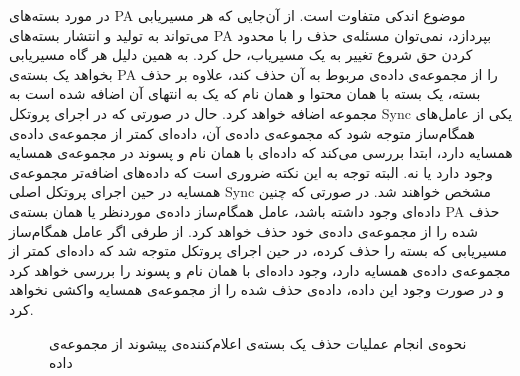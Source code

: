 در مورد بسته‌های PA موضوع اندکی متفاوت است. از آن‌جایی که هر مسیریابی می‌تواند به تولید و انتشار بسته‌های PA بپردازد، نمی‌توان مسئله‌ی حذف را با محدود کردن حق شروع تغییر به یک مسیریاب، حل کرد. به همین دلیل هر گاه مسیریابی بخواهد یک بسته‌ی PA را از مجموعه‌ی داده‌ی مربوط به آن حذف کند، علاوه بر حذف بسته، یک بسته با همان محتوا و همان نام که یک  به انتهای آن اضافه شده است به مجموعه اضافه خواهد کرد. حال در صورتی که در اجرای پروتکل Sync یکی از عامل‌های همگام‌ساز متوجه شود که مجموعه‌ی داده‌ی آن، داده‌ای کمتر از مجموعه‌ی داده‌ی همسایه دارد، ابتدا بررسی می‌کند که داده‌ای با همان نام و پسوند  در مجموعه‌ی همسایه وجود دارد یا نه. البته توجه به این نکته ضروری است که داده‌های اضافه‌تر مجموعه‌ی همسایه در حین اجرای پروتکل اصلی Sync مشخص خواهند شد. در صورتی که چنین داده‌ای وجود داشته باشد، عامل همگام‌ساز داده‌ی موردنظر یا همان بسته‌ی PA حذف شده را از مجموعه‌ی داده‌ی خود حذف خواهد کرد. از طرفی اگر عامل همگام‌ساز مسیریابی که بسته را حذف کرده، در حین اجرای پروتکل متوجه شد که داده‌ای کمتر از مجموعه‌ی داده‌ی همسایه دارد، وجود داده‌ای با همان نام و پسوند  را بررسی خواهد کرد و در صورت وجود این داده، داده‌ی حذف شده را از مجموعه‌ی همسایه واکشی نخواهد کرد.

\begin{figure}[h!]
\centering
%
\caption{نحوه‌ی انجام عملیات حذف یک بسته‌ی اعلام‌کننده‌ی پیشوند از مجموعه‌ی داده}
\label{fig:Sync2}
\end{figure}


